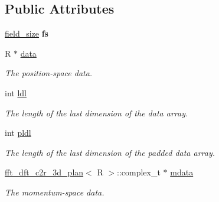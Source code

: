 \subsection*{Public Attributes}
\begin{DoxyCompactItemize}
\item 
\hypertarget{classfield_ae4706cc48462e7ff81aace174cc02c6b}{
\hyperlink{structfield__size}{field\_\-size} {\bfseries fs}}
\label{classfield_ae4706cc48462e7ff81aace174cc02c6b}

\item 
R $\ast$ \hyperlink{classfield_a5c465fa5d00104c5bbb683a6574a4057}{data}
\begin{DoxyCompactList}\small\item\em The position-\/space data. \item\end{DoxyCompactList}\item 
\hypertarget{classfield_abab5ca89b0c6dde39ce92a372d3446bf}{
int \hyperlink{classfield_abab5ca89b0c6dde39ce92a372d3446bf}{ldl}}
\label{classfield_abab5ca89b0c6dde39ce92a372d3446bf}

\begin{DoxyCompactList}\small\item\em The length of the last dimension of the data array. \item\end{DoxyCompactList}\item 
\hypertarget{classfield_a673a06623fbbe0daf28e2406c195582e}{
int \hyperlink{classfield_a673a06623fbbe0daf28e2406c195582e}{pldl}}
\label{classfield_a673a06623fbbe0daf28e2406c195582e}

\begin{DoxyCompactList}\small\item\em The length of the last dimension of the padded data array. \item\end{DoxyCompactList}\item 
\hypertarget{classfield_a49ff854ecfe1997596a425e34964af9b}{
\hyperlink{classfft__dft__c2r__3d__plan}{fft\_\-dft\_\-c2r\_\-3d\_\-plan}$<$ R $>$::complex\_\-t $\ast$ \hyperlink{classfield_a49ff854ecfe1997596a425e34964af9b}{mdata}}
\label{classfield_a49ff854ecfe1997596a425e34964af9b}

\begin{DoxyCompactList}\small\item\em The momentum-\/space data. \item\end{DoxyCompactList}\end{DoxyCompactItemize}
